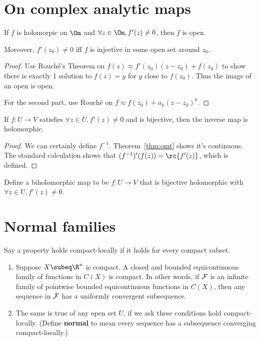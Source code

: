\section{On complex analytic maps}
\begin{thm}
If $f$ is holomorpic on $\Om$ and $\forall z\in \Om, f'(z)\ne 0$, then $f$ is open.

Moreover, $f'(z_0)\ne0$ iff $f$ is injective in some open set around $z_0$.
\end{thm}
\begin{proof}
Use Rouch\'e's Theorem on $f(z)\approx f'(z_0)(z-z_0)+f(z_0)$ to show there is exactly 1 solution to $f(z)=y$ for $y$ close to $f(z_0)$. Thus the image of an open is open.

For the second part, use Rouch\'e on $f\approx f(z_0)+a_k(z-z_0)^k$.
\end{proof}

\begin{lem}
If $f:U\to V$ satisfies $\forall z\in U,f'(z)\ne 0$ and is bijective, then the inverse map is holomorphic.
\end{lem}
\begin{proof}
We can certainly define $f^{-1}$. Theorem~\ref{thm:omt} shows it's continuous. The standard calculation shows that $(f^{-1})'(f(z))=\rc{f'(z)}$, which is defined.

\end{proof}
Define a biholomorphic map to be $f:U\to V$ that is bijective holomorphic with $\forall z\in U,f'(z)\ne0$.
\section{Normal families}
Say a property holds compact-locally if it holds for every compact subset.
\begin{thm}
\begin{enumerate}
\item
Suppose $X\subeq \R^n$ is compact. A closed and bounded equicontinuous family of functions in $C(X)$ is compact. 
In other words, if $\cal F$ is an infinite family of pointwise bounded equicontinuous functions in $C(X)$, then any sequence in $\cal F$ has a uniformly convergent subsequence. 
\item
The same is true of any open set $U$, if we ask these conditions hold compact-locally. (Define \textbf{normal} to mean every sequence has a subsequence converging compact-locally.)
\end{enumerate}
\end{thm}

